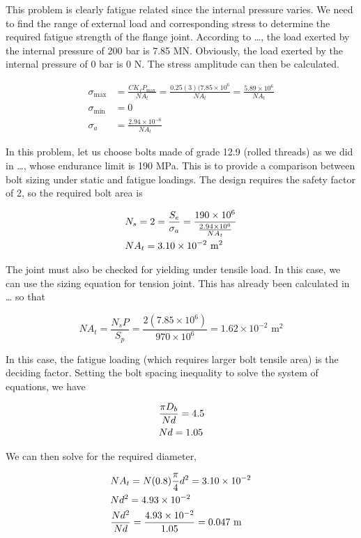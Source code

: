 \documentclass[a4paper,openany,12pt]{book}
\begin{document}
{{This problem is clearly fatigue related since the internal pressure
varies. We need to find the range of external load and corresponding
stress to determine the required fatigue strength of the flange joint.
According to \ldots{}, the load exerted by the internal pressure of 200 bar is 7.85 MN.
Obviously, the load exerted by the internal pressure of 0 bar is 0 N.
The stress amplitude can then be calculated.

$$\begin{aligned}
  \sigma_{\max } &= \frac{CK_fP_{\max}}{NA_t} = \frac{0.25(3)(7.85 \times 10^6}{NA_t} = \frac{5.89 \times 10^6}{NA_t} \\ 
  \sigma_{\min } &= 0 \\ 
  \sigma_a&= \frac{2.94 \times 10^{-6}}{NA_t} \end{aligned}$$

In this problem, let us choose bolts made of grade 12.9 (rolled threads)
as we did in \ldots{}, whose endurance limit is 190 MPa. This is to provide a comparison
between bolt sizing under static and fatigue loadings. The design
requires the safety factor of 2, so the required bolt area is

$$\begin{gathered}
  N_s = 2 = \frac{S_e}{\sigma_a} = \frac{190 \times 10^6}{\frac{2.94 \times 10^6}{NA_t}} \hfill \\
  NA_t = 3.10 \times 10^{-2} \text{ m}^2 \hfill \\ 
\end{gathered}$$

The joint must also be checked for yielding under tensile load. In this
case, we can use the sizing equation for tension joint. This has already
been calculated in \ldots{} so that

$$NA_t = \frac{N_sP}{S_p} = \frac{2(7.85 \times 10^6)}{970 \times 10^6} = 1.62 \times 10^{-2} \text{ m}^2$$

In this case, the fatigue loading (which requires larger bolt tensile
area) is the deciding factor. Setting the bolt spacing inequality to
solve the system of equations, we have

$$\begin{gathered}
  \frac{\pi D_b}{Nd} = 4.5 \hfill \\
  Nd = 1.05 \hfill  \end{gathered}$$

We can then solve for the required diameter,

$$\begin{gathered}
  NA_t = N(0.8)\frac{\pi }{4}d^2 = 3.10 \times 10^{-2} \hfill \\
  Nd^2 = 4.93 \times 10^{-2} \hfill \\
  \frac{Nd^2}{Nd} = \frac{4.93 \times 10^{-2}}{1.05} = 0.047 \text{ m} \hfill\end{gathered}$$

}}
\end{document}
